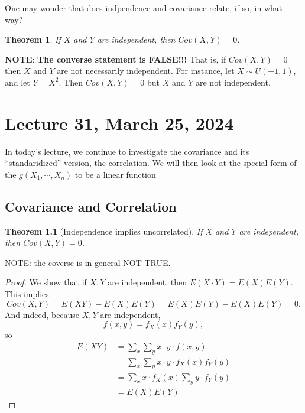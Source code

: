 \documentclass[
]{book}
\newtheorem{theorem}{Theorem}[chapter]
\theoremstyle{definition}
\theoremstyle{definition}
\theoremstyle{definition}
\theoremstyle{definition}
\theoremstyle{remark}
\begin{document}
One may wonder that does indpendence and covariance relate, if so, in what way?

\begin{theorem}
If \(X\) and \(Y\) are independent, then \(Cov(X,Y)=0\).
\end{theorem}

\textbf{NOTE}: \textbf{The converse statement is FALSE!!!} That is, if \(Cov(X,Y)=0\) then \(X\) and \(Y\) are not necessarily independent. For instance, let \(X\sim U(-1,1)\), and let \(Y =X^2\). Then \(Cov(X,Y)=0\) but \(X\) and \(Y\) are not independent.

\chapter{Lecture 31, March 25, 2024}\label{lecture-31-march-25-2024}

\newcommand{\var}{\mathbb{V}ar}
\newcommand{\R}{\mathbb{R}}
\newcommand{\E}{\mathbb{E}}
\newcommand{\N}{\mathcal{N}}

In today's lecture, we continue to investigate the covariance and its *standaridized'' version, the correlation. We will then look at the special form of the \(g(X_1,\cdots,X_n)\) to be a linear function

\section{Covariance and Correlation}\label{covariance-and-correlation}

\begin{theorem}[Independence implies uncorrelated]
If \(X\) and \(Y\) are independent, then \(Cov(X,Y)=0\).
\end{theorem}

NOTE: the coverse is in general NOT TRUE.

\begin{proof}
We show that if \(X,Y\) are independent, then \(E(X\cdot Y)=E(X)E(Y)\). This implies
\[ Cov(X,Y)=E(XY)-E(X)E(Y)=E(X)E(Y)-E(X)E(Y)=0.\]
And indeed, because \(X,Y\) are independent,
\[ f(x,y)=f_X(x)f_Y(y),\]
so
\begin{align*}
  E(XY)&=\sum_x \sum_y x\cdot y \cdot f(x,y)\\
  &= \sum_x \sum_y x\cdot y \cdot f_X(x)f_Y(y)\\
  &= \sum_x x \cdot f_X(x) \sum_y y \cdot f_Y(y)\\
  &= E(X) E(Y)
\end{align*}
\end{proof}
\end{document}
